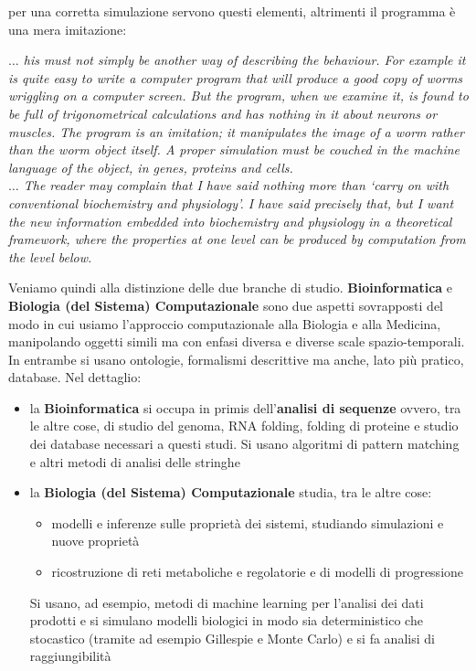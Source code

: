 \documentclass[a4paper,12pt, oneside]{book}
\begin{document}
per una corretta simulazione servono questi elementi, altrimenti il programma è
una mera imitazione:
\begin{center}
  \emph{$\ldots$ his must not simply be another way of describing the
    behaviour. For example it is quite easy to write a computer program that
    will produce a good copy of worms wriggling on a computer screen. But the
    program, when we examine it, is found to be full of trigonometrical
    calculations and has nothing in it about neurons or muscles. The program is
    an imitation; it manipulates the image of a worm rather than the worm object
    itself. A proper simulation must be couched in the machine language of the
    object, in genes, proteins and cells.} \\
  \emph{$\ldots$ The reader may complain that I have said nothing more than
    `carry on with conventional biochemistry and physiology'. I have said
    precisely that, but I want the new information embedded into biochemistry
    and physiology in a theoretical framework, where the properties at one level
    can be produced by computation from the level below.} 
\end{center}
Veniamo quindi alla distinzione delle due branche di
studio. \textbf{Bioinformatica} e \textbf{Biologia (del Sistema) Computazionale}
sono due aspetti sovrapposti del modo in cui usiamo l'approccio computazionale
alla Biologia e alla Medicina, manipolando oggetti simili ma con enfasi diversa
e diverse scale spazio-temporali. In entrambe si usano ontologie, formalismi
descrittive ma anche, lato più pratico, database. Nel dettaglio:
\begin{itemize}
  \item la \textbf{Bioinformatica} si occupa in primis dell'\textbf{analisi di
    sequenze} ovvero, tra le altre cose, di studio del genoma, RNA folding,
  folding di proteine e studio dei database necessari a questi studi. Si usano
  algoritmi di pattern matching e altri metodi di analisi delle stringhe
  \item la \textbf{Biologia (del Sistema) Computazionale} studia, tra le altre
  cose:
  \begin{itemize}
    \item modelli e inferenze sulle proprietà dei sistemi, studiando simulazioni
    e nuove proprietà
    \item ricostruzione di reti metaboliche e regolatorie e di modelli di
    progressione 
  \end{itemize}
  Si usano, ad esempio, metodi di machine learning per l'analisi dei dati
  prodotti e si simulano modelli biologici in modo sia deterministico che
  stocastico (tramite ad esempio Gillespie e Monte Carlo) e si fa analisi di
  raggiungibilità 
\end{itemize}
\end{document}
